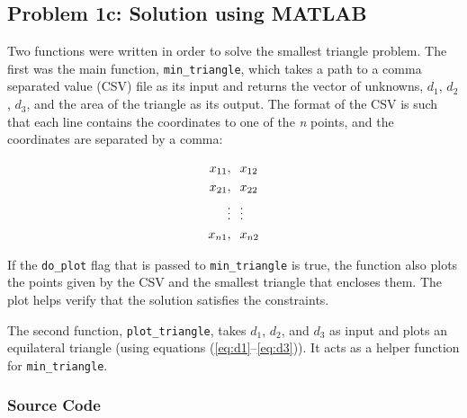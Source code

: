 \documentclass{article}
\begin{document}
\subsection{Problem 1c: Solution using MATLAB}

Two functions were written in order to solve the smallest triangle problem.
The first was the main function, \texttt{min\_triangle}, which takes a path to a comma separated value (CSV) file as its input and returns the vector of unknowns, $d_1$, $d_2$, $d_3$, and the area of the triangle as its output.
The format of the CSV is such that each line contains the coordinates to one of the \textit{n} points, and the coordinates are separated by a comma:

\begin{align*}
x_{11}, & \hspace{0.1in} x_{12}\\
x_{21}, & \hspace{0.1in} x_{22}\\
\vdots & \hspace{0.1in} \vdots\\
x_{n1}, & \hspace{0.1in} x_{n2}
\end{align*}

\noindent If the \texttt{do\_plot} flag that is passed to \texttt{min\_triangle} is true, the function also plots the points given by the CSV and the smallest triangle that encloses them.
The plot helps verify that the solution satisfies the constraints.

The second function, \texttt{plot\_triangle}, takes $d_1$, $d_2$, and $d_3$ as input and plots an equilateral triangle (using equations (\ref{eq:d1}--\ref{eq:d3})).
It acts as a helper function for \texttt{min\_triangle}.

\subsubsection{Source Code}
\end{document}
